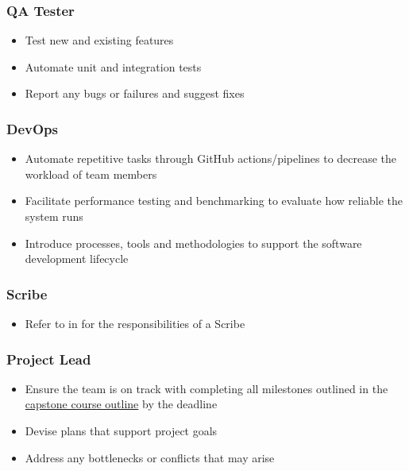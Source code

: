 \documentclass[12pt,letterpaper]{article}
\begin{document}
\subsubsection{QA Tester}
\begin{itemize}
    \item Test new and existing features
    \item Automate unit and integration tests
    \item Report any bugs or failures and suggest fixes 
\end{itemize}

\subsubsection{DevOps}
\begin{itemize}
    \item Automate repetitive tasks through GitHub actions/pipelines to decrease
    the workload of team members
    \item Facilitate performance testing and benchmarking to evaluate how
    reliable the system runs
    \item Introduce processes, tools and methodologies to support the software
    development lifecycle
\end{itemize}

\subsubsection{Scribe}
\begin{itemize}
    \item Refer to  in  for the
    responsibilities of a Scribe
\end{itemize}

\subsubsection{Project Lead}
\begin{itemize}
    \item Ensure the team is on track with completing all milestones outlined in
    the
    \href{https://gitlab.cas.mcmaster.ca/courses/capstone/-/blob/main/CourseOutline/Capstone_Outline.pdf}{capstone
    course outline} by the deadline
    \item Devise plans that support project goals
    \item Address any bottlenecks or conflicts that may arise 
\end{itemize}
\end{document}
